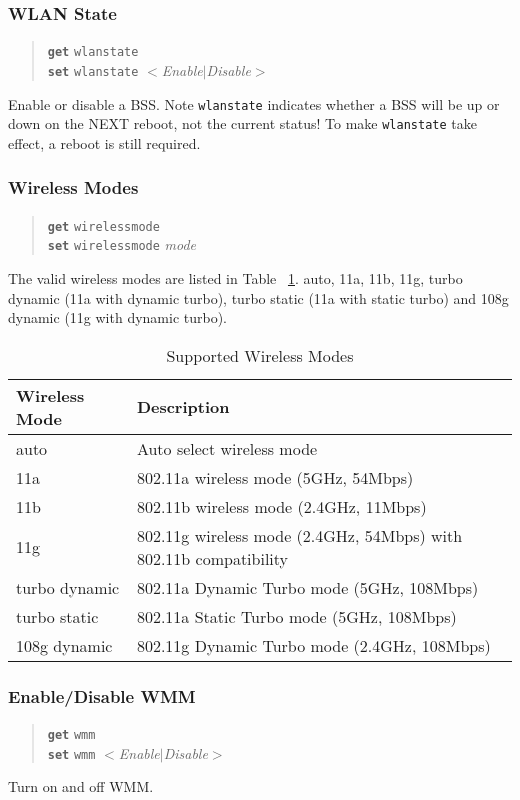 \documentclass[10pt,fullpage]{article}
\newcommand{\bv}{\begin{verse}}
\newcommand{\ev}{\end{verse}}
\newcommand{\clicmd}[1]{{\textbf{\texttt{#1}}}}
\newcommand{\cliparam}[1]{{\texttt{#1}}}
\newcommand{\clival}[1]{{\emph{#1}}}
\begin{document}
\subsubsection{WLAN State}
\bv
\clicmd{get} \cliparam{wlanstate}\\
\clicmd{set} \cliparam{wlanstate} $<$\clival{Enable}$|$\clival{Disable}$>$
\ev
Enable or disable a BSS. Note \cliparam{wlanstate} indicates whether a BSS will be
up or down on the NEXT reboot, not the current status! To make \cliparam{wlanstate}
take effect, a reboot is still required.

\subsubsection{Wireless Modes}
\bv
\clicmd{get} \cliparam{wirelessmode}\\
\clicmd{set} \cliparam{wirelessmode} \clival{mode}
\ev
The valid wireless modes are listed in Table ~\ref{tab:wmode}.
auto, 11a, 11b, 11g, turbo dynamic (11a with
dynamic turbo), turbo static (11a with static turbo) and 108g dynamic (11g
with dynamic turbo).
\begin{table}[h*]
  \centering
  \begin{tabular}{|l|l|} \hline
    Wireless Mode & Description \\ \hline
    auto & Auto select wireless mode \\
    11a & 802.11a wireless mode (5GHz, 54Mbps) \\
    11b & 802.11b wireless mode (2.4GHz, 11Mbps) \\
    11g & 802.11g wireless mode (2.4GHz, 54Mbps) with 802.11b compatibility \\
    turbo dynamic & 802.11a Dynamic Turbo mode (5GHz, 108Mbps) \\
    turbo static & 802.11a Static Turbo mode (5GHz, 108Mbps) \\
    108g dynamic & 802.11g Dynamic Turbo mode (2.4GHz, 108Mbps) \\ \hline
  \end{tabular}
  \caption{Supported Wireless Modes}
  \label{tab:wmode}
\end{table}

\subsubsection{Enable/Disable WMM}
\bv
\clicmd{get} \cliparam{wmm}\\
\clicmd{set} \cliparam{wmm} $<$\clival{Enable}$|$\clival{Disable}$>$
\ev
Turn on and off WMM.
\end{document}
